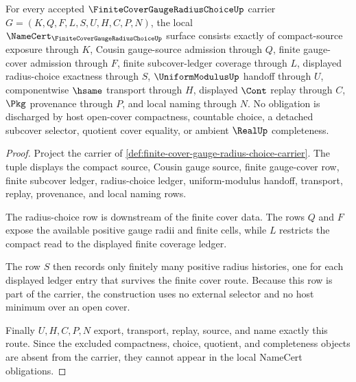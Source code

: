 \begin{theorem}
\label{thm:finite-cover-gauge-radius-choice-namecert-obligations}
For every accepted $\FiniteCoverGaugeRadiusChoiceUp$ carrier $G=(K,Q,F,L,S,U,H,C,P,N)$, the local $\NameCert_{\FiniteCoverGaugeRadiusChoiceUp}$ surface consists exactly of compact-source exposure through $K$, Cousin gauge-source admission through $Q$, finite gauge-cover admission through $F$, finite subcover-ledger coverage through $L$, displayed radius-choice exactness through $S$, $\UniformModulusUp$ handoff through $U$, componentwise $\hsame$ transport through $H$, displayed $\Cont$ replay through $C$, $\Pkg$ provenance through $P$, and local naming through $N$. No obligation is discharged by host open-cover compactness, countable choice, a detached subcover selector, quotient cover equality, or ambient $\RealUp$ completeness.
\end{theorem}
\begin{proof}
Project the carrier of \autoref{def:finite-cover-gauge-radius-choice-carrier}. The tuple displays the compact source, Cousin gauge source, finite gauge-cover row, finite subcover ledger, radius-choice ledger, uniform-modulus handoff, transport, replay, provenance, and local naming rows.

The radius-choice row is downstream of the finite cover data. The rows $Q$ and $F$ expose the available positive gauge radii and finite cells, while $L$ restricts the compact read to the displayed finite coverage ledger.

The row $S$ then records only finitely many positive radius histories, one for each displayed ledger entry that survives the finite cover route. Because this row is part of the carrier, the construction uses no external selector and no host minimum over an open cover.

Finally $U,H,C,P,N$ export, transport, replay, source, and name exactly this route. Since the excluded compactness, choice, quotient, and completeness objects are absent from the carrier, they cannot appear in the local NameCert obligations.
\end{proof}

